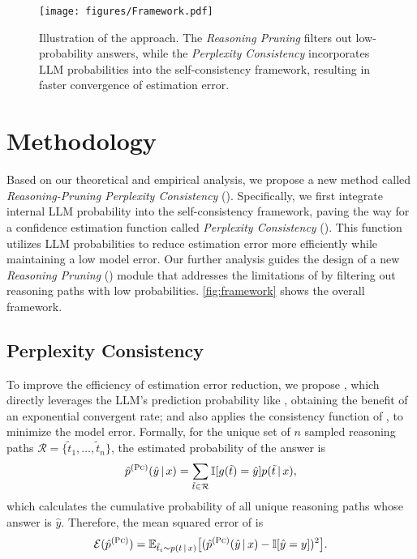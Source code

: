 \begin{figure*}[t]
    \begin{center}
        \texttt{[image: figures/Framework.pdf]}
        \caption{Illustration of the \RPC approach. The \emph{Reasoning Pruning} filters out low-probability answers, while the \emph{Perplexity Consistency} incorporates LLM probabilities into the self-consistency framework, resulting in faster convergence of estimation error.}
        \label{fig:framework}
    \end{center}
    \vskip -0.2in
\end{figure*}

\section{Methodology}
\label{sec:method}

Based on our theoretical and empirical analysis, we propose a new method called \emph{Reasoning-Pruning Perplexity Consistency} (\RPC). 
Specifically, we first integrate internal LLM probability into the self-consistency framework, paving the way for a confidence estimation function called \emph{Perplexity Consistency} (\PC). 
This function utilizes LLM probabilities to reduce estimation error more efficiently while maintaining a low model error.
Our further analysis guides the design of a new \emph{Reasoning Pruning} (\RP) module that addresses the limitations of \PC by filtering out reasoning paths with low probabilities.
\autoref{fig:framework} shows the overall framework.

\subsection{Perplexity Consistency}

To improve the efficiency of estimation error reduction, we propose \PC, which directly leverages the LLM's prediction probability like \PP, obtaining the benefit of an exponential convergent rate; 
and also applies the consistency function of \SC, to minimize the model error.
Formally, for the unique set of $n$ sampled reasoning paths $\mathcal{R} = \{\tilde{t}_1, \dots, \tilde{t}_n\}$, the estimated probability of the answer is
\begin{equation*}
\begin{aligned}
\hat{p}^{(\textsc{Pc})}(\hat{y} \,|\, x) = \sum_{\tilde{t} \in \mathcal{R}} \mathbb{I}[g(\tilde{t}) = \hat{y}] p(\tilde{t} \,|\, x),
\end{aligned}
\end{equation*}
which calculates the cumulative probability of all unique reasoning paths whose answer is $\hat{y}$.
Therefore, the mean squared error of \PC is
\begin{equation*}
    \begin{aligned}
      \mathcal{E}(\hat{p}^{(\textsc{Pc})}) = \mathbb{E}_{\tilde{t}_i \sim p(t \,|\, x)} \big[( \hat{p}^{(\textsc{Pc})}(\hat{y} \,|\, x) - \mathbb{I}[\hat{y} = y] )^2 \big]. 
\end{aligned}
\end{equation*}
        
